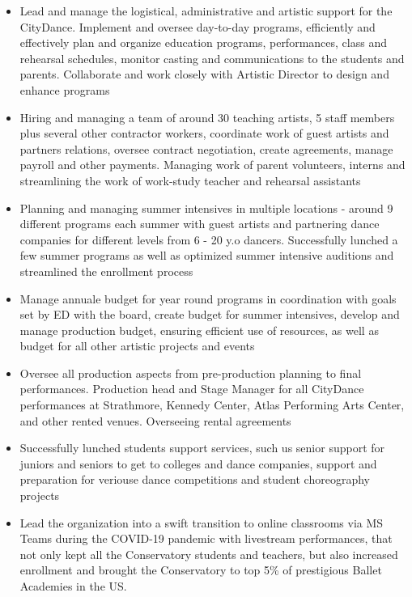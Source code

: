 \documentclass[
  letterpaper,
  DIV=11,
  numbers=noendperiod]{scrartcl}
\providecommand{\tightlist}{%
  \setlength{\itemsep}{0pt}\setlength{\parskip}{0pt}}\usepackage{longtable,booktabs,array}
\begin{document}
\begin{itemize}
\tightlist
\item
  Lead and manage the logistical, administrative and artistic support
  for the CityDance. Implement and oversee day-to-day programs,
  efficiently and effectively plan and organize education programs,
  performances, class and rehearsal schedules, monitor casting and
  communications to the students and parents. Collaborate and work
  closely with Artistic Director to design and enhance programs
\item
  Hiring and managing a team of around 30 teaching artists, 5 staff
  members plus several other contractor workers, coordinate work of
  guest artists and partners relations, oversee contract negotiation,
  create agreements, manage payroll and other payments. Managing work of
  parent volunteers, interns and streamlining the work of work-study
  teacher and rehearsal assistants
\item
  Planning and managing summer intensives in multiple locations - around
  9 different programs each summer with guest artists and partnering
  dance companies for different levels from 6 - 20 y.o dancers.
  Successfully lunched a few summer programs as well as optimized summer
  intensive auditions and streamlined the enrollment process
\item
  Manage annuale budget for year round programs in coordination with
  goals set by ED with the board, create budget for summer intensives,
  develop and manage production budget, ensuring efficient use of
  resources, as well as budget for all other artistic projects and
  events
\item
  Oversee all production aspects from pre-production planning to final
  performances. Production head and Stage Manager for all CityDance
  performances at Strathmore, Kennedy Center, Atlas Performing Arts
  Center, and other rented venues. Overseeing rental agreements
\item
  Successfully lunched students support services, such us senior support
  for juniors and seniors to get to colleges and dance companies,
  support and preparation for veriouse dance competitions and student
  choreography projects
\item
  Lead the organization into a swift transition to online classrooms via
  MS Teams during the COVID-19 pandemic with livestream performances,
  that not only kept all the Conservatory students and teachers, but
  also increased enrollment and brought the Conservatory to top 5\% of
  prestigious Ballet Academies in the US.
\end{itemize}
\end{document}
